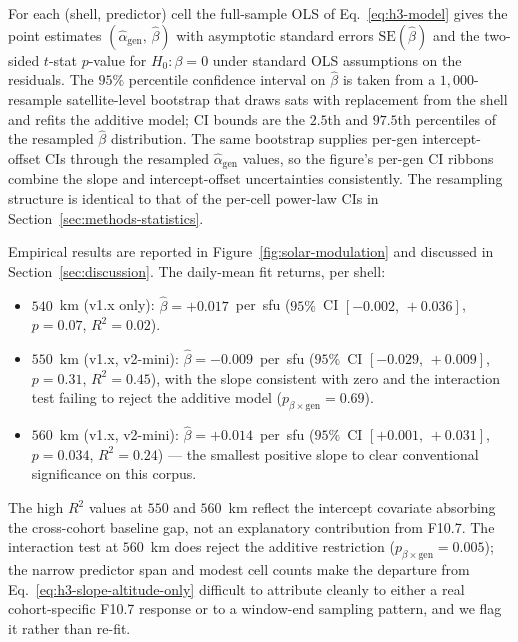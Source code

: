 \documentclass[10pt, letterpaper]{article}
\begin{document}
For each (shell, predictor) cell the full-sample OLS of
Eq.~\eqref{eq:h3-model} gives the point estimates
$(\hat\alpha_{\mathrm{gen}},\,\hat\beta)$ with asymptotic
standard errors $\mathrm{SE}(\hat\beta)$ and the two-sided
$t$-stat $p$-value for $H_{0}\!: \beta = 0$ under standard OLS
assumptions on the residuals. The $95\%$ percentile confidence
interval on $\hat\beta$ is taken from a $1{,}000$-resample
satellite-level bootstrap that draws sats with replacement from
the shell and refits the additive model; CI bounds are the
$2.5$th and $97.5$th percentiles of the resampled $\hat\beta$
distribution. The same bootstrap supplies per-gen intercept-offset
CIs through the resampled $\hat\alpha_{\mathrm{gen}}$ values, so
the figure's per-gen CI ribbons combine the slope and
intercept-offset uncertainties consistently. The resampling
structure is identical to that of the per-cell power-law CIs in
Section~\ref{sec:methods-statistics}.

Empirical results are reported in
Figure~\ref{fig:solar-modulation} and discussed in
Section~\ref{sec:discussion}. The daily-mean fit returns, per
shell:
\begin{itemize}
  \item $540$~km (v1.x only):
  $\hat\beta = +0.017$~per~sfu ($95\%$~CI $[-0.002,\,+0.036]$,
  $p = 0.07$, $R^{2} = 0.02$).
  \item $550$~km (v1.x, v2-mini):
  $\hat\beta = -0.009$~per~sfu ($95\%$~CI $[-0.029,\,+0.009]$,
  $p = 0.31$, $R^{2} = 0.45$), with the slope consistent with
  zero and the interaction test failing to reject the additive
  model ($p_{\beta\times\mathrm{gen}} = 0.69$).
  \item $560$~km (v1.x, v2-mini):
  $\hat\beta = +0.014$~per~sfu ($95\%$~CI
  $[+0.001,\,+0.031]$, $p = 0.034$, $R^{2} = 0.24$) --- the
  smallest positive slope to clear conventional significance on
  this corpus.
\end{itemize}
The high $R^{2}$ values at $550$ and $560$~km reflect the
intercept covariate absorbing the cross-cohort baseline gap, not
an explanatory contribution from F10.7. The interaction test at
$560$~km does reject the additive restriction
($p_{\beta\times\mathrm{gen}} = 0.005$); the narrow predictor
span and modest cell counts make the departure from
Eq.~\eqref{eq:h3-slope-altitude-only} difficult to attribute
cleanly to either a real cohort-specific F10.7 response or to a
window-end sampling pattern, and we flag it rather than re-fit.
\end{document}
